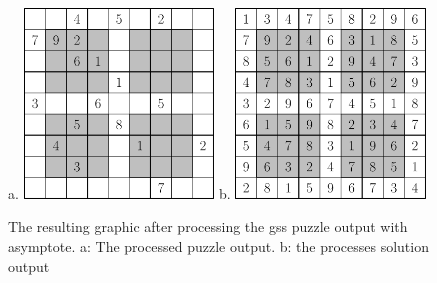 \documentclass[12pt]{article}
\begin{document}
\begin{figure}
	\begin{center}
	a.
	\includegraphics[width=0.45\textwidth]{NRC}
	b.
	\includegraphics[width=0.45\textwidth]{NRC_solved}
	\end{center}
	\caption{\label{NRCout}The resulting graphic after processing the gss puzzle output with asymptote. a: The processed puzzle output. b: the processes solution output}
\end{figure}
\end{document}
